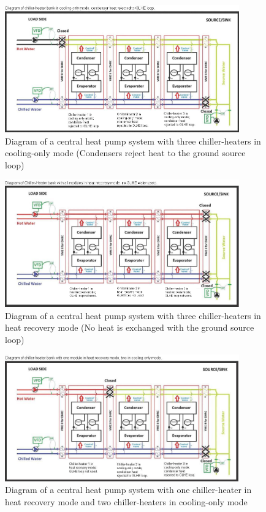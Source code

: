 \begin{figure}[hbtp] %
\centering
\includegraphics[width=0.9\textwidth, height=0.9\textheight, keepaspectratio=true]{media/image185.png}
\caption{Diagram of a central heat pump system with three chiller-heaters in cooling-only mode (Condensers reject heat to the ground source loop) \protect \label{fig:diagram-of-a-central-heat-pump-system-with}}
\end{figure}

\begin{figure}[hbtp] %
\centering
\includegraphics[width=0.9\textwidth, height=0.9\textheight, keepaspectratio=true]{media/image186.png}
\caption{Diagram of a central heat pump system with three chiller-heaters in heat recovery mode         (No heat is exchanged with the ground source loop) \protect \label{fig:diagram-of-a-central-heat-pump-system-with-001}}
\end{figure}

\begin{figure}[hbtp] %
\centering
\includegraphics[width=0.9\textwidth, height=0.9\textheight, keepaspectratio=true]{media/image187.png}
\caption{Diagram of a central heat pump system with one chiller-heater in heat recovery mode and two chiller-heaters in cooling-only mode \protect \label{fig:diagram-of-a-central-heat-pump-system-with-002}}
\end{figure}

